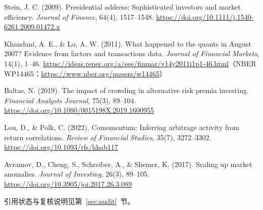 \documentclass[11pt,a4paper]{article}
\begin{document}
\begin{enumerate}[label={[\arabic*]},itemsep=2pt]
\item Stein, J. C. (2009). Presidential address: Sophisticated investors and market efficiency. \emph{Journal of Finance}, 64(4), 1517--1548. \url{https://doi.org/10.1111/j.1540-6261.2009.01472.x}
\item Khandani, A. E., \& Lo, A. W. (2011). What happened to the quants in August 2007? Evidence from factors and transactions data. \emph{Journal of Financial Markets}, 14(1), 1--46. \url{https://ideas.repec.org/a/eee/finmar/v14y2011i1p1-46.html}（NBER WP14465：\url{https://www.nber.org/papers/w14465}）
\item Baltas, N. (2019). The impact of crowding in alternative risk premia investing. \emph{Financial Analysts Journal}, 75(3), 89--104. \url{https://doi.org/10.1080/0015198X.2019.1600955}
\item Lou, D., \& Polk, C. (2022). Comomentum: Inferring arbitrage activity from return correlations. \emph{Review of Financial Studies}, 35(7), 3272--3302. \url{https://doi.org/10.1093/rfs/hhab117}
\item Avramov, D., Cheng, S., Schreiber, A., \& Shemer, K. (2017). Scaling up market anomalies. \emph{Journal of Investing}, 26(3), 89--105. \url{https://doi.org/10.3905/joi.2017.26.3.089}
\end{enumerate}

\vfill
\begin{center}\footnotesize
引用状态与复核说明见第~\ref{sec:audit}~节。
\end{center}
\end{document}
